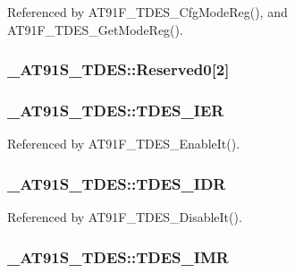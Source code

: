 Referenced by AT91F\_\-TDES\_\-CfgModeReg(), and AT91F\_\-TDES\_\-GetModeReg().\hypertarget{struct__AT91S__TDES_e2972cb00f78bd3947d036cd464bfcce}{
\subsubsection{ {\bf \_\-AT91S\_\-TDES::Reserved0}\mbox{[}2\mbox{]}}}
\label{struct__AT91S__TDES_e2972cb00f78bd3947d036cd464bfcce}


\hypertarget{struct__AT91S__TDES_22d098ef906e1e524e762a202d5dc27d}{
\subsubsection{ {\bf \_\-AT91S\_\-TDES::TDES\_\-IER}}}
\label{struct__AT91S__TDES_22d098ef906e1e524e762a202d5dc27d}




Referenced by AT91F\_\-TDES\_\-EnableIt().\hypertarget{struct__AT91S__TDES_12b83111ccac647664613ab4b4b8281f}{
\subsubsection{ {\bf \_\-AT91S\_\-TDES::TDES\_\-IDR}}}
\label{struct__AT91S__TDES_12b83111ccac647664613ab4b4b8281f}




Referenced by AT91F\_\-TDES\_\-DisableIt().\hypertarget{struct__AT91S__TDES_d4ddcccc04c725741459056df6041e3c}{
\subsubsection{ {\bf \_\-AT91S\_\-TDES::TDES\_\-IMR}}}
\label{struct__AT91S__TDES_d4ddcccc04c725741459056df6041e3c}




